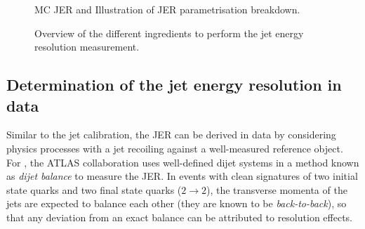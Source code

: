

\FloatBarrier
\begin{figure}[t]
    \caption{MC JER and Illustration of JER parametrisation breakdown.}
    \label{fig:jer-parametrisation}
\end{figure}

\FloatBarrier
\begin{figure}[t]
    \caption{Overview of the different ingredients to perform the jet energy resolution measurement.}
    \label{fig:flow-chart-jer}
\end{figure}


\subsection{Determination of the jet energy resolution in data}
Similar to the \insitu jet calibration, the JER can be derived in data by considering physics processes with a jet recoiling against a well-measured reference object. For \RunTwo, the ATLAS collaboration uses well-defined dijet systems in a method known as \emph{dijet balance} to measure the JER.
In events with clean signatures of two initial state quarks and two final state quarks ($2 \rightarrow 2$), the transverse momenta of the jets are expected to balance each other (they are known to be \emph{back-to-back}), so that any deviation from an exact balance can be attributed to resolution effects.

